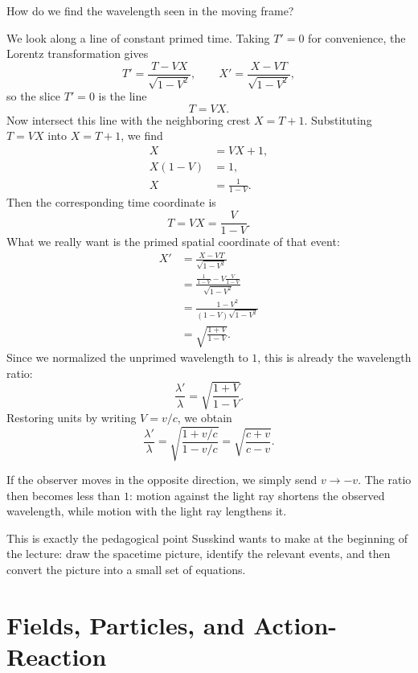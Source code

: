 How do we find the wavelength seen in the moving frame?

We look along a line of constant primed time. Taking \(T'=0\) for convenience, the Lorentz transformation gives
\begin{equation}
T'=\frac{T-VX}{\sqrt{1-V^2}},
\qquad
X'=\frac{X-VT}{\sqrt{1-V^2}},
\end{equation}
so the slice \(T'=0\) is the line
\begin{equation}
T=VX.
\end{equation}
Now intersect this line with the neighboring crest \(X=T+1\). Substituting \(T=VX\) into \(X=T+1\), we find
\begin{align}
X &= VX+1,\\
X(1-V) &= 1,\\
X &= \frac{1}{1-V}.
\end{align}
Then the corresponding time coordinate is
\begin{equation}
T=VX=\frac{V}{1-V}.
\end{equation}
What we really want is the primed spatial coordinate of that event:
\begin{align}
X'&=\frac{X-VT}{\sqrt{1-V^2}}\\
&=\frac{\frac{1}{1-V}-V\frac{V}{1-V}}{\sqrt{1-V^2}}\\
&=\frac{1-V^2}{(1-V)\sqrt{1-V^2}}\\
&=\sqrt{\frac{1+V}{1-V}}.
\end{align}
Since we normalized the unprimed wavelength to \(1\), this is already the wavelength ratio:
\begin{equation}
\frac{\lambda'}{\lambda}=\sqrt{\frac{1+V}{1-V}}.
\end{equation}
Restoring units by writing \(V=v/c\), we obtain
\begin{equation}
\frac{\lambda'}{\lambda}
=
\sqrt{\frac{1+v/c}{1-v/c}}
=
\sqrt{\frac{c+v}{c-v}}.
\end{equation}

If the observer moves in the opposite direction, we simply send \(v\to -v\). The ratio then becomes less than \(1\): motion against the light ray shortens the observed wavelength, while motion with the light ray lengthens it.

This is exactly the pedagogical point Susskind wants to make at the beginning of the lecture: draw the spacetime picture, identify the relevant events, and then convert the picture into a small set of equations.

\section{Fields, Particles, and Action-Reaction}

